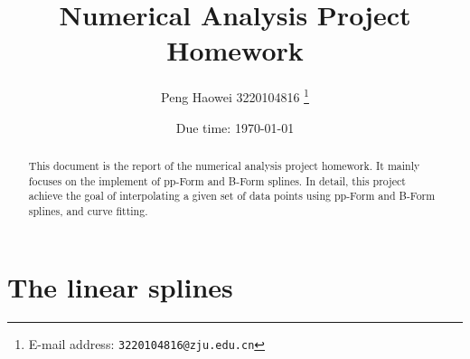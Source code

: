 \documentclass[a4paper]{article}
\begin{document}
\title{\textbf{Numerical Analysis Project Homework}}

\author{Peng Haowei 3220104816
  \thanks{E-mail address: \texttt{3220104816@zju.edu.cn}}}

\date{Due time: \today}

\maketitle

\begin{abstract}
  This document is the report of the numerical analysis project homework. It mainly focuses on the implement of pp-Form and B-Form splines. In detail, this project achieve the goal of interpolating a given set of data points using pp-Form and B-Form splines, and curve fitting.
\end{abstract}

\section{The linear splines}
\end{document}
